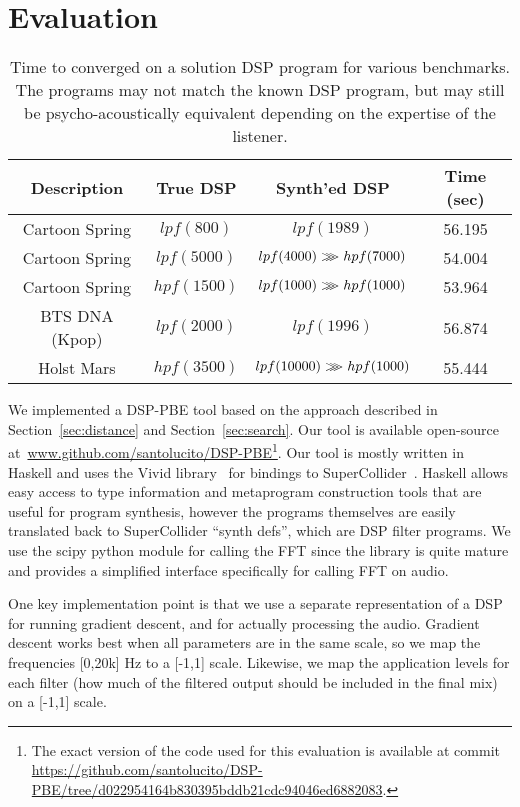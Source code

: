 \section{Evaluation}
\label{sec:eval}
\begin{table*}[!ht]
\centering
\caption{Time to converged on a solution DSP program for various benchmarks. The programs may not match the known DSP program, but may still be psycho-acoustically equivalent depending on the expertise of the listener. }
\setlength\tabcolsep{2em}
\begin{tabular}{|c | c | c | c |} 
 \hline
 Description & True DSP & Synth'ed DSP & Time (sec) \\ 
 \hline\hline
 Cartoon Spring & $lpf(800)  $ & $lpf(1989) $ & 56.195 \\
 Cartoon Spring & $lpf(5000) $ & $lpf(4000) >\mkern-9mu>\mkern-9mu> hpf(7000) $ & 54.004 \\
 Cartoon Spring & $hpf(1500) $ & $lpf(1000) >\mkern-9mu>\mkern-9mu> hpf(1000) $ & 53.964 \\
 BTS DNA (Kpop) & $lpf(2000) $ & $lpf(1996)	 $ & 56.874 \\
 Holst Mars     & $hpf(3500) $ & $lpf(10000) >\mkern-9mu>\mkern-9mu> hpf(1000)$  & 55.444 \\
 \hline
\end{tabular}
\label{table:eval}
\end{table*}

We implemented a DSP-PBE tool based on the approach described in Section~\ref{sec:distance} and Section~\ref{sec:search}.
Our tool is available open-source at~\url{www.github.com/santolucito/DSP-PBE}\footnote{The exact version of the code used for this evaluation is available at commit \url{https://github.com/santolucito/DSP-PBE/tree/d022954164b830395bddb21cdc94046ed6882083}.}.
Our tool is mostly written in Haskell and uses the Vivid library~\cite{vivid} for bindings to SuperCollider~\cite{supercollider}.
Haskell allows easy access to type information and metaprogram construction tools that are useful for program synthesis, however the programs themselves are easily translated back to SuperCollider ``synth defs'', which are DSP filter programs.
We use the scipy python module for calling the FFT since the library is quite mature and provides a simplified interface specifically for calling FFT on audio.

One key implementation point is that we use a separate representation of a DSP for running gradient descent, and for actually processing the audio.
Gradient descent works best when all parameters are in the same scale, so we map the frequencies [0,20k] Hz to a [-1,1] scale.
Likewise, we map the application levels for each filter (how much of the filtered output should be included in the final mix) on a [-1,1] scale.

